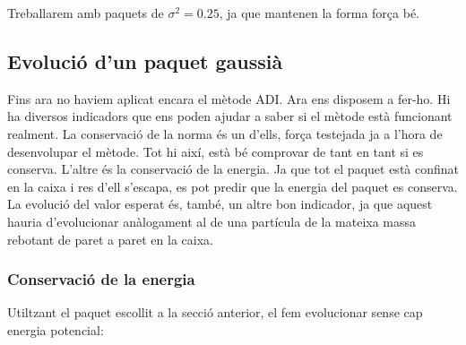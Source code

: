 \documentclass{article}
\begin{document}
Treballarem amb paquets de \(\sigma^2=0.25\), ja que mantenen la forma força bé.

\subsection{Evolució d'un paquet gaussià}

Fins ara no haviem aplicat encara el mètode ADI. Ara ens disposem a fer-ho. Hi ha diversos indicadors que ens poden ajudar a saber si el mètode està funcionant realment. La conservació de la norma és un d'ells, força testejada ja a l'hora de desenvolupar el mètode. Tot hi així, està bé comprovar de tant en tant si es conserva. L'altre és la conservació de la energia. Ja que tot el paquet està confinat en la caixa i res d'ell s'escapa, es pot predir que la energia del paquet es conserva. La evolució del valor esperat és, també, un altre bon indicador, ja que aquest hauria d'evolucionar anàlogament al de una partícula de la mateixa massa rebotant de paret a paret en la caixa.

\subsubsection{Conservació de la energia}

Utiltzant el paquet escollit a la secció anterior, el fem evolucionar sense cap energia potencial:
\end{document}
